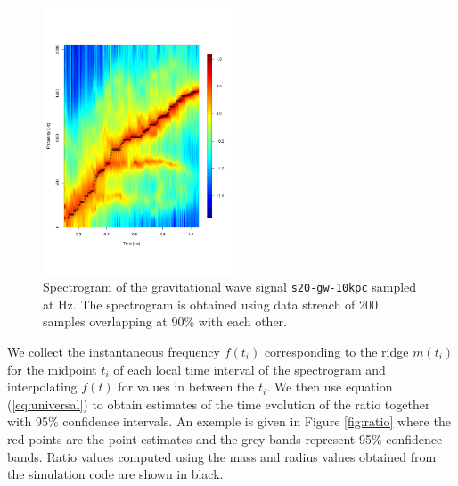 \begin{figure}
 \centering
 \includegraphics[width=0.5\textwidth]{plots/spectrogram}
 \caption{Spectrogram of the gravitational wave signal {\tt s20-gw-10kpc} sampled at \unit[4096]{Hz}.
   The spectrogram is obtained using data streach of 200 samples overlapping at 90\%
   with each other.} \label{fig:spectrogram}
\end{figure}


We collect the instantaneous frequency $f(t_i)$ corresponding to the ridge $m(t_i)$ for
the midpoint $t_i$ of each local time interval of the spectrogram and interpolating $f(t)$
for values in between the $t_i$. We then use equation (\ref{eq:universal}) to obtain
estimates of the time evolution of the ratio together with 95\% confidence intervals.
An exemple is given in Figure \ref{fig:ratio} where the red points are the point estimates and
the grey bands represent 95\% confidence bands. Ratio values
computed using the mass and radius values obtained from the simulation code are shown in black.


